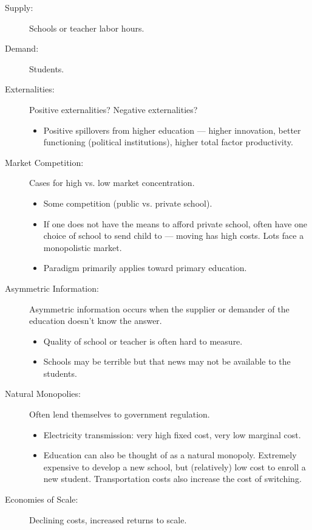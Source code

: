 \documentclass[10pt]{extarticle}
\begin{document}
  \begin{description}
    \item[Supply:] Schools or teacher labor hours.
    \item[Demand:] Students.
    \item[Externalities:] Positive externalities? Negative externalities?
      \begin{itemize}
        \item Positive spillovers from higher education --- higher innovation, better functioning (political institutions), higher total factor productivity.
      \end{itemize}
    \item[Market Competition:] Cases for high vs. low market concentration.
      \begin{itemize}
        \item Some competition (public vs. private school).
        \item If one does not have the means to afford private school, often have one choice of school to send child to --- moving has high costs. Lots face a monopolistic market.
        \item Paradigm primarily applies toward primary education.
      \end{itemize}
    \item[Asymmetric Information:] Asymmetric information occurs when the supplier or demander of the education doesn't know the answer.
      \begin{itemize}
        \item Quality of school or teacher is often hard to measure.
        \item Schools may be terrible but that news may not be available to the students.
      \end{itemize}
    \item[Natural Monopolies:] Often lend themselves to government regulation.
      \begin{itemize}
        \item Electricity transmission: very high fixed cost, very low marginal cost.
        \item Education can also be thought of as a natural monopoly. Extremely expensive to develop a new school, but (relatively) low cost to enroll a new student. Transportation costs also increase the cost of switching.
      \end{itemize}
    \item[Economies of Scale:] Declining costs, increased returns to scale.

\end{description}
\end{document}
